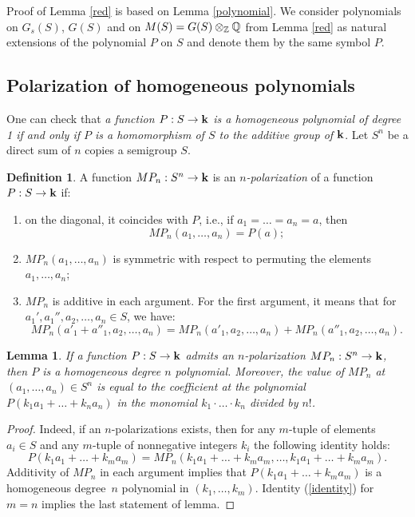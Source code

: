 \documentclass[11pt]{article}
\theoremstyle{plain}
\newtheorem{lemma}[theorem]{Lemma}
\theoremstyle{definition}
\newtheorem{definition}[theorem]{Definition}
\begin{document}
Proof of Lemma \ref{red} is based on  Lemma \ref{polynomial}.
We consider  polynomials on $G_s(S)$, $G(S)$  and on
$M(S)=G(S)\otimes_\Bbb Z \Bbb Q$  from Lemma \ref{red} as natural
extensions of the polynomial $P$ on $S$ and  denote them by the same
symbol $P$.

\subsection{Polarization of  homogeneous polynomials}\label{subsec2.3}

One can check  that {\it a function $P:S\to \bold k$ is a homogeneous
polynomial of degree 1 if and only if $P$ is a homomorphism of $S$ to
the additive group of $\bold k$}. Let $S^n$ be a direct sum of
$n$ copies a semigroup $S$.

\begin{definition} A function $MP_n:S^n\to \bold k$ is an {\it
$n$-polarization} of a function $P:S\to \bold k$ if:
\begin{enumerate}
\item  on the diagonal, it coincides with $P$, i.e., if
$a_1=\dots=a_n=a$, then
\begin{equation*}MP_n(a_1,\dots, a_n)=P(a);\end{equation*}

\item  $MP_n(a_1,\dots, a_n)$ is symmetric  with respect to permuting
the elements
$a_1,\dots,a_n$;

\item $MP_n$  is additive  in each argument.
For the first argument, it  means that for  $a_1', a_1'',
a_2,\dots,a_n\in S$, we have:
\begin{equation*}MP_n(a'_1 + a''_1, a_2,\dots, a_n)=
MP_n(a'_1,a_2,
\dots,a_n)+ MP_n(a''_1,a_2, \dots,a_n).\end{equation*}
\end{enumerate}
\end{definition}

\begin{lemma}\label{n!} If  a function $P:S\to \bold k$ admits an
$n$-polarization $MP_n:S^n\to \bold k$, then $P$ is a homogeneous degree
$n$ polynomial. Moreover, the value of $MP_n$ at  $(a_1,\dots,a_n)\in
S^n$ is equal to  the coefficient at the polynomial
$P(k_1a_1+\dots+k_na_n)$  in the monomial $k_1\cdot \ldots\cdot k_n$ divided by $n!$.
\end{lemma}

\begin{proof} Indeed, if an $n$-polarizations exists, then for any
$m$-tuple of elements $a_i\in S$ and any $m$-tuple of nonnegative
integers $k_i$ the following identity holds:
\begin{equation}\label{identity}
  P(k_1a_1+\dots+k_ma_m) =MP_n(k_1a_1+\dots+k_ma_m,
\dots,k_1a_1+\dots+k_ma_m).
\end{equation}
Additivity of $MP_n$ in each argument implies that
$P(k_1a_1+\dots+k_ma_m)$ is a homogeneous degree~$n$ polynomial in
$(k_1,\dots,k_m)$.  Identity (\ref{identity})  for $m=n$  implies
the last statement of lemma.
\end{proof}
\end{document}
